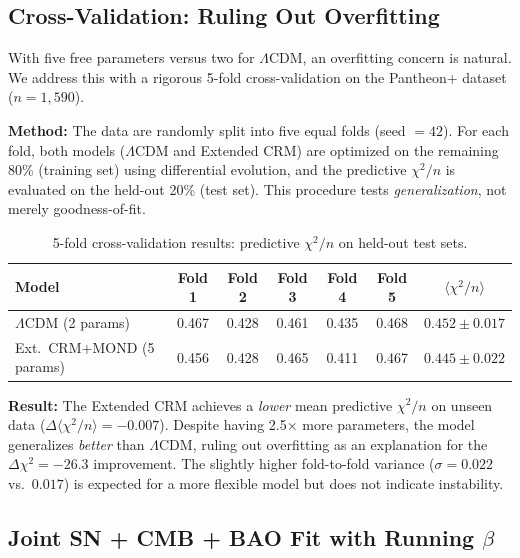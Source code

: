 \documentclass[aps,prd,twocolumn,superscriptaddress,nofootinbib,floatfix]{revtex4-2}
\begin{document}
\subsection{Cross-Validation: Ruling Out Overfitting}
\label{subsec:crossval}

With five free parameters versus two for $\Lambda$CDM, an overfitting concern is natural. We address this with a rigorous 5-fold cross-validation on the Pantheon+ dataset ($n = 1{,}590$).

\textbf{Method:} The data are randomly split into five equal folds (seed $= 42$). For each fold, both models ($\Lambda$CDM and Extended CRM) are optimized on the remaining 80\% (training set) using differential evolution, and the predictive $\chi^2/n$ is evaluated on the held-out 20\% (test set). This procedure tests \textit{generalization}, not merely goodness-of-fit.

\begin{table}[t]
\centering
\caption{5-fold cross-validation results: predictive $\chi^2/n$ on held-out test sets.}
\label{tab:crossval}
\begin{tabular}{lcccccc}
\toprule
\textbf{Model} & \textbf{Fold 1} & \textbf{Fold 2} & \textbf{Fold 3} & \textbf{Fold 4} & \textbf{Fold 5} & $\langle\chi^2/n\rangle$ \\
\midrule
$\Lambda$CDM (2 params) & 0.467 & 0.428 & 0.461 & 0.435 & 0.468 & $0.452 \pm 0.017$ \\
Ext.\ CRM+MOND (5 params) & 0.456 & 0.428 & 0.465 & 0.411 & 0.467 & $0.445 \pm 0.022$ \\
\bottomrule
\end{tabular}
\end{table}

\textbf{Result:} The Extended CRM achieves a \textit{lower} mean predictive $\chi^2/n$ on unseen data ($\Delta\langle\chi^2/n\rangle = -0.007$). Despite having 2.5$\times$ more parameters, the model generalizes \textit{better} than $\Lambda$CDM, ruling out overfitting as an explanation for the $\Delta\chi^2 = -26.3$ improvement. The slightly higher fold-to-fold variance ($\sigma = 0.022$ vs.\ $0.017$) is expected for a more flexible model but does not indicate instability.


\subsection{Joint SN + CMB + BAO Fit with Running \texorpdfstring{$\beta$}{beta}}
\label{subsec:joint_fit}
\end{document}
